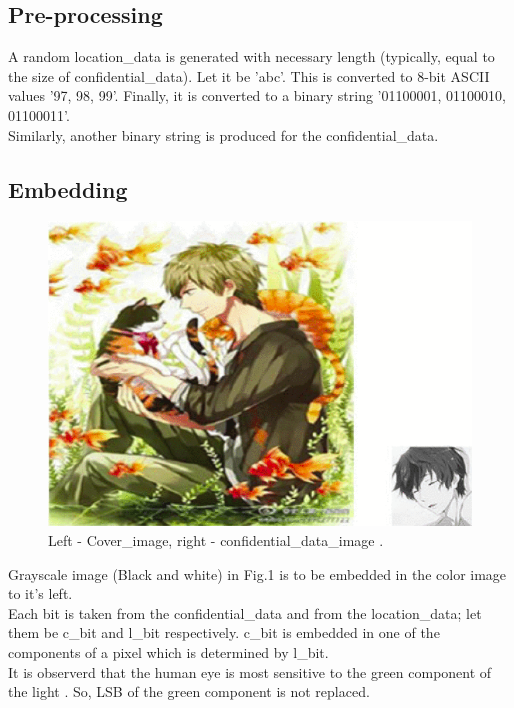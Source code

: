 \documentclass[conference]{IEEEtran}
\begin{document}
\subsection{Pre-processing}
A random location\_data is generated with necessary length (typically, equal to the size of confidential\_data). Let it be 'abc'.
This is converted to 8-bit ASCII values '97, 98, 99'.
Finally, it is converted to a binary string '01100001, 01100010, 01100011'.\\

Similarly, another binary string is produced for the confidential\_data.\\

\subsection{Embedding}

\begin{figure}[H]
  \includegraphics[width=\linewidth]{cover_image_cum_confidential_data.png}
  \caption{Left - Cover\_image, right - confidential\_data\_image \cite{b2}.}
\end{figure}

Grayscale image (Black and white) in Fig.1 is to be embedded in the color image to it's left.\\

Each bit is taken from the confidential\_data and from the location\_data;
let them be c\_bit and l\_bit respectively.
c\_bit is embedded in one of the components of a pixel which is determined by l\_bit.\\

It is observerd that the human eye is most sensitive to the green component of the light \cite{b2}.
So, LSB of the green component is not replaced.\\
\end{document}
